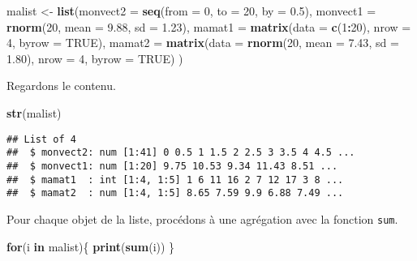 \documentclass[]{book}
\newenvironment{Shaded}{\begin{snugshade}}{\end{snugshade}}
\newcommand{\KeywordTok}[1]{\textcolor[rgb]{0.13,0.29,0.53}{\textbf{#1}}}
\newcommand{\DataTypeTok}[1]{\textcolor[rgb]{0.13,0.29,0.53}{#1}}
\newcommand{\DecValTok}[1]{\textcolor[rgb]{0.00,0.00,0.81}{#1}}
\newcommand{\FloatTok}[1]{\textcolor[rgb]{0.00,0.00,0.81}{#1}}
\newcommand{\StringTok}[1]{\textcolor[rgb]{0.31,0.60,0.02}{#1}}
\newcommand{\OtherTok}[1]{\textcolor[rgb]{0.56,0.35,0.01}{#1}}
\newcommand{\ControlFlowTok}[1]{\textcolor[rgb]{0.13,0.29,0.53}{\textbf{#1}}}
\newcommand{\OperatorTok}[1]{\textcolor[rgb]{0.81,0.36,0.00}{\textbf{#1}}}
\newcommand{\NormalTok}[1]{#1}
\begin{document}
\begin{Shaded}
\begin{Highlighting}[]
\NormalTok{malist <-}\StringTok{ }\KeywordTok{list}\NormalTok{(}\DataTypeTok{monvect2 =} \KeywordTok{seq}\NormalTok{(}\DataTypeTok{from =} \DecValTok{0}\NormalTok{, }\DataTypeTok{to =} \DecValTok{20}\NormalTok{, }\DataTypeTok{by =} \FloatTok{0.5}\NormalTok{),}
               \DataTypeTok{monvect1 =} \KeywordTok{rnorm}\NormalTok{(}\DecValTok{20}\NormalTok{, }\DataTypeTok{mean =} \FloatTok{9.88}\NormalTok{, }\DataTypeTok{sd =} \FloatTok{1.23}\NormalTok{),}
               \DataTypeTok{mamat1 =} \KeywordTok{matrix}\NormalTok{(}\DataTypeTok{data =} \KeywordTok{c}\NormalTok{(}\DecValTok{1}\OperatorTok{:}\DecValTok{20}\NormalTok{), }\DataTypeTok{nrow =} \DecValTok{4}\NormalTok{, }\DataTypeTok{byrow =} \OtherTok{TRUE}\NormalTok{),}
               \DataTypeTok{mamat2 =} \KeywordTok{matrix}\NormalTok{(}\DataTypeTok{data =} \KeywordTok{rnorm}\NormalTok{(}\DecValTok{20}\NormalTok{, }\DataTypeTok{mean =} \FloatTok{7.43}\NormalTok{, }\DataTypeTok{sd =} \FloatTok{1.80}\NormalTok{), }\DataTypeTok{nrow =} \DecValTok{4}\NormalTok{, }\DataTypeTok{byrow =} \OtherTok{TRUE}\NormalTok{)}
\NormalTok{               )}
\end{Highlighting}
\end{Shaded}

Regardons le contenu.

\begin{Shaded}
\begin{Highlighting}[]
\KeywordTok{str}\NormalTok{(malist)}
\end{Highlighting}
\end{Shaded}

\begin{verbatim}
## List of 4
##  $ monvect2: num [1:41] 0 0.5 1 1.5 2 2.5 3 3.5 4 4.5 ...
##  $ monvect1: num [1:20] 9.75 10.53 9.34 11.43 8.51 ...
##  $ mamat1  : int [1:4, 1:5] 1 6 11 16 2 7 12 17 3 8 ...
##  $ mamat2  : num [1:4, 1:5] 8.65 7.59 9.9 6.88 7.49 ...
\end{verbatim}

Pour chaque objet de la liste, procédons à une agrégation avec la
fonction \texttt{sum}.

\begin{Shaded}
\begin{Highlighting}[]
\ControlFlowTok{for}\NormalTok{(i }\ControlFlowTok{in}\NormalTok{ malist)\{}
  \KeywordTok{print}\NormalTok{(}\KeywordTok{sum}\NormalTok{(i))}
\NormalTok{  \}}
\end{Highlighting}
\end{Shaded}
\end{document}
